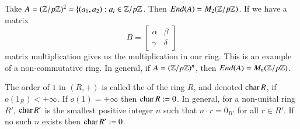 \documentclass[12pt, a4paper, oneside, openright, titlepage]{book}
\begin{document}
\begin{eg}
        Take $A = (\mathbb Z/p\mathbb Z)^2 = \{(a_1,a_2): a_i \in \mathbb Z/p\mathbb Z$. Then $End(A) = M_2(\mathbb Z/p\mathbb Z)$. If we have a matrix \begin{equation}
                B = \begin{bmatrix} \alpha & \beta \\ \gamma & \delta \end{bmatrix}
        \end{equation}
        matrix multiplication gives us the multiplication in our ring. This is an example of a non-commutative ring. In general, if $A = (\mathbb Z/p\mathbb Z)^n$, then $End(A) = M_n(\mathbb Z/p\mathbb Z)$.
\end{eg}


\begin{defn}
    The order of $1$ in $(R,+)$ is called the  of the ring $R$, and denoted $\operatorname{char} R$, if $o(1_R) < +\infty$. If $o(1) = +\infty$ then $\operatorname{char} R := 0$. In general, for a non-unital ring $R'$, $\operatorname{char} R'$ is the smallest positive integer $n$ such that $n\cdot r = 0_{R'}$ for all $r \in R'$. If no such $n$ exists then $\operatorname{char} R' := 0$. 
\end{defn}
\end{document}
